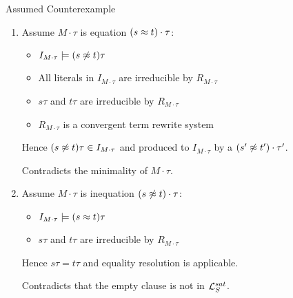 \documentclass[%
handout,
]{beamer}
\begin{document}
\begin{frame}[allowframebreaks]{Assumed Counterexample}
    \begin{enumerate}
        \item Assume $M\cdot\tau$ is equation $(s\approx t)\cdot\tau$:
        \begin{itemize}
            \item $I_{M\cdot\tau}\models (s\not\approx t)\tau$
            \item All literals in $I_{M\cdot\tau}$ are irreducible by $R_{M\cdot\tau}$
            \item $s\tau$ and $t\tau$ are irreducible by $R_{M\cdot\tau}$
            \item $R_{M\cdot\tau}$ is a convergent term rewrite system
        \end{itemize}
        Hence $(s\not\approx t)\tau\in I_{M\cdot\tau}$ and
        produced to $I_{M\cdot\tau}$ by a $(s'\not\approx t')\cdot\tau'$.

        Contradicts the minimality of $M\cdot\tau$.
        \vspace{0.5em}

        \item Assume $M\cdot\tau$ is inequation $(s\not\approx t)\cdot\tau$:
        \begin{itemize}
            \item $I_{M\cdot\tau}\models (s\approx t)\tau$
            \item $s\tau$ and $t\tau$ are irreducible by $R_{M\cdot\tau}$
        \end{itemize}
        Hence $s\tau = t\tau$ and equality resolution is applicable.

        Contradicts that the empty clause is not in $\mathcal{L}_S^{sat}$.
    \end{enumerate}






\end{frame}
\end{document}
